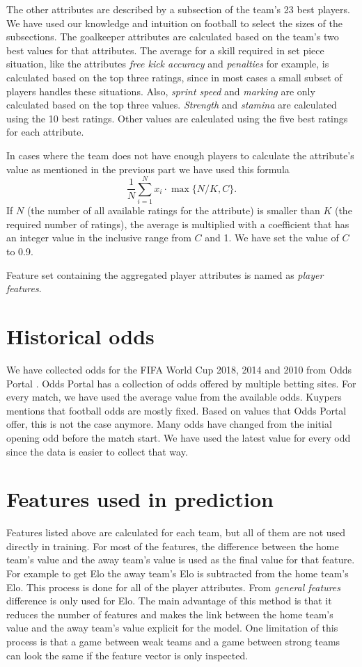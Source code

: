 The other attributes are described by a subsection of the team's 23 best players. We have used our knowledge and intuition on football to select the sizes of the subsections. The goalkeeper attributes are calculated based on the team's two best values for that attributes. The average for a skill required in set piece situation, like the attributes \textit{free kick accuracy} and \textit{penalties} for example, is calculated based on the top three ratings, since in most cases a small subset of players handles these situations. Also, \textit{sprint speed} and \textit{marking} are only calculated based on the top three values. \textit{Strength} and \textit{stamina} are calculated using the 10 best ratings. Other values are calculated using the five best ratings for each attribute.

In cases where the team does not have enough players to calculate the attribute's value as mentioned in the previous part we have used this formula
\begin{equation}
\frac{1}{N}\sum_{i=1}^{N}x_i \cdot \max{\{N/K, C\}}.
\end{equation}
If $N$ (the number of all available ratings for the attribute) is smaller than $K$ (the required number of ratings), the average is multiplied with a coefficient that has an integer value in the inclusive range from $C$ and 1. We have set the value of $C$ to 0.9.

Feature set containing the aggregated player attributes is named as \textit{player features}.

\section{Historical odds}
We have collected odds for the FIFA World Cup 2018, 2014 and 2010 from Odds Portal \cite{oddsportal}. Odds Portal has a collection of odds offered by multiple betting sites. For every match, we have used the average value from the available odds. Kuypers \cite{kuypers2008} mentions that football odds are mostly fixed. Based on values that Odds Portal offer, this is not the case anymore. Many odds have changed from the initial opening odd before the match start. We have used the latest value for every odd since the data is easier to collect that way.

\section{Features used in prediction}
Features listed above are calculated for each team, but all of them are not used directly in training. For most of the features, the difference between the home team's value and the away team's value is used as the final value for that feature. For example to get Elo the away team's Elo is subtracted from the home team's Elo. This process is done for all of the player attributes. From \textit{general features} difference is only used for Elo. The main advantage of this method is that it reduces the number of features and makes the link between the home team's value and the away team's value explicit for the model. One limitation of this process is that a game between weak teams and a game between strong teams can look the same if the feature vector is only inspected.

